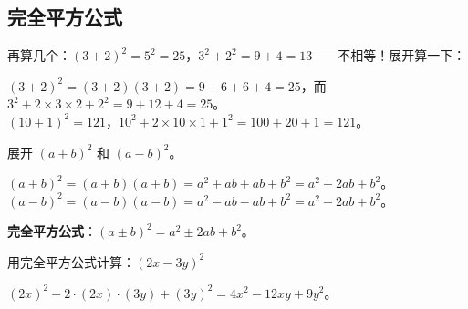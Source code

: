 \subsection*{完全平方公式}

再算几个：$(3+2)^2 = 5^2 = 25$，$3^2+2^2 = 9+4 = 13$——不相等！展开算一下：

$(3+2)^2 = (3+2)(3+2) = 9+6+6+4 = 25$，而 $3^2+2\times3\times2+2^2 = 9+12+4 = 25$。\\
$(10+1)^2 = 121$，$10^2+2\times10\times1+1^2 = 100+20+1=121$。

\begin{example}
展开 $(a+b)^2$ 和 $(a-b)^2$。
\end{example}
\begin{solution}
$(a+b)^2 = (a+b)(a+b) = a^2 + ab + ab + b^2 = a^2 + 2ab + b^2$。\\
$(a-b)^2 = (a-b)(a-b) = a^2 - ab - ab + b^2 = a^2 - 2ab + b^2$。

\textbf{完全平方公式}：$(a\pm b)^2 = a^2 \pm 2ab + b^2$。
\end{solution}

\begin{example}
用完全平方公式计算：$(2x-3y)^2$
\end{example}
\begin{solution}
$(2x)^2 - 2\cdot(2x)\cdot(3y) + (3y)^2 = 4x^2 - 12xy + 9y^2$。
\end{solution}

